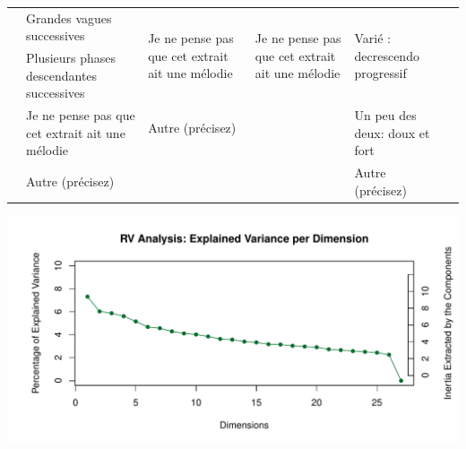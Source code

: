 \documentclass[
]{article}
\newenvironment{Shaded}{\begin{snugshade}}{\end{snugshade}}
\newcommand{\AttributeTok}[1]{\textcolor[rgb]{0.77,0.63,0.00}{#1}}
\newcommand{\DecValTok}[1]{\textcolor[rgb]{0.00,0.00,0.81}{#1}}
\newcommand{\FunctionTok}[1]{\textcolor[rgb]{0.00,0.00,0.00}{#1}}
\newcommand{\NormalTok}[1]{#1}
\newcommand{\OtherTok}[1]{\textcolor[rgb]{0.56,0.35,0.01}{#1}}
\newcommand{\SpecialCharTok}[1]{\textcolor[rgb]{0.00,0.00,0.00}{#1}}
\newcommand{\StringTok}[1]{\textcolor[rgb]{0.31,0.60,0.02}{#1}}
\newenvironment{lltable}{\begin{landscape}\begin{center}\begin{ThreePartTable}}{\end{ThreePartTable}\end{center}\end{landscape}}
\begin{document}
\begin{lltable}
\begin{footnotesize}
\begin{longtable}{p{}p{}p{}p{}p{}p{}}
  & Grandes vagues successives & \multirow{2}{0.2\textwidth}{Je ne pense pas que cet extrait ait une mélodie} & \multirow{2}{0.2\textwidth}{Je ne pense pas que cet extrait ait une mélodie} & \multirow{2}{0.2\textwidth}{Varié : decrescendo progressif} &\\
  & Plusieurs phases descendantes successives & & & & \\
  & \multirow{2}{0.2\textwidth}{Je ne pense pas que cet extrait ait une mélodie} & Autre (précisez) & & \multirow{2}{0.2\textwidth}{Un peu des deux: doux et fort}  &\\
  & & & & & \\
  & Autre (précisez) & & & Autre (précisez) & \\
  
\cmidrule[.75pt]{2-5}
\end{longtable}
\end{footnotesize}
\end{lltable}

\begin{center}\includegraphics{MusDes_Supplementary_files/figure-latex/screeRV-1} \end{center}

\begin{Shaded}
\end{Shaded}
\end{document}

